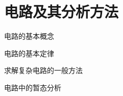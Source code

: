 \chapter{电路及其分析方法}

\begin{introduction}
    \item 电路的基本概念
    \item 电路的基本定律
    \item 求解复杂电路的一般方法
    \item 电路中的暂态分析
\end{introduction}











